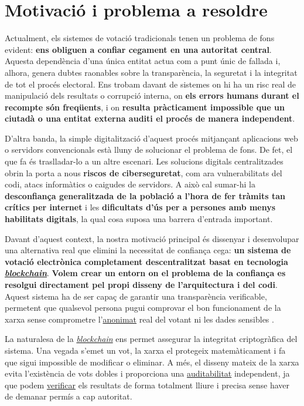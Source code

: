\section{Motivació i problema a resoldre}

Actualment, els sistemes de votació tradicionals tenen un problema de fons evident: \textbf{ens obliguen a confiar cegament en una autoritat central}. 
Aquesta dependència d'una única entitat actua com a punt únic de fallada i, alhora, genera dubtes raonables sobre la transparència, la seguretat i la integritat de tot el procés electoral. 
Ens trobam davant de sistemes on hi ha un risc real de manipulació dels resultats o corrupció interna, on \textbf{els errors humans durant el recompte són freqüents}, i on \textbf{resulta pràcticament impossible que un ciutadà o una entitat externa auditi el procés de manera independent}.

D'altra banda, la simple digitalització d'aquest procés mitjançant aplicacions web o servidors convencionals està lluny de solucionar el problema de fons. De fet, el que fa és traslladar-lo a un altre escenari. 
Les solucions digitals centralitzades obrin la porta a nous \textbf{riscos de ciberseguretat}, com ara vulnerabilitats del codi, atacs informàtics o caigudes de servidors. 
A això cal sumar-hi la \textbf{desconfiança generalitzada de la població a l'hora de fer tràmits tan crítics per internet} i les \textbf{dificultats d'ús per a persones amb menys habilitats digitals}, la qual cosa suposa una barrera d'entrada important.

Davant d'aquest context, la nostra motivació principal és dissenyar i desenvolupar una alternativa real que elimini la necessitat de confiança cega: \textbf{un sistema de votació electrònica completament descentralitzat basat en tecnologia \hyperlink{def:blockchain}{\textit{blockchain}}}. 
\textbf{Volem crear un entorn on el problema de la confiança es resolgui directament pel propi disseny de l'arquitectura i del codi}. 
Aquest sistema ha de ser capaç de garantir una transparència verificable, permetent que qualsevol persona pugui comprovar el bon funcionament de la xarxa sense comprometre l'\hyperlink{def:anonimat}{anonimat} real del votant ni les dades sensibles \cite{su16114387} \cite{nakamoto} \cite{vladucu2023} \cite{berenjestanaki2024}.

La naturalesa de la \hyperlink{def:blockchain}{\textit{blockchain}} ens permet assegurar la integritat criptogràfica del sistema. Una vegada s'emet un vot, la xarxa el protegeix matemàticament i fa que sigui impossible de modificar o eliminar. 
A més, el disseny mateix de la xarxa evita l'existència de vots dobles i proporciona una \hyperlink{def:auditabilitat}{auditabilitat} independent, ja que podem \hyperlink{def:verificabilitat}{verificar} els resultats de forma totalment lliure i precisa sense haver de demanar permís a cap autoritat.

